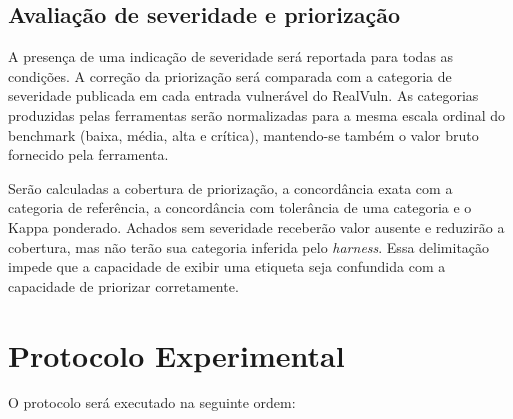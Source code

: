 \subsection{Avaliação de severidade e priorização}\label{subsec:priorizacao-metodologia}

A presença de uma indicação de severidade será reportada para todas as condições. A correção da priorização será comparada com a categoria de severidade publicada em cada entrada vulnerável do RealVuln. As categorias produzidas pelas ferramentas serão normalizadas para a mesma escala ordinal do benchmark (baixa, média, alta e crítica), mantendo-se também o valor bruto fornecido pela ferramenta.

Serão calculadas a cobertura de priorização, a concordância exata com a categoria de referência, a concordância com tolerância de uma categoria e o Kappa ponderado. Achados sem severidade receberão valor ausente e reduzirão a cobertura, mas não terão sua categoria inferida pelo \textit{harness}. Essa delimitação impede que a capacidade de exibir uma etiqueta seja confundida com a capacidade de priorizar corretamente.

\section{Protocolo Experimental}\label{sec:protocolo-experimental}

O protocolo será executado na seguinte ordem:

